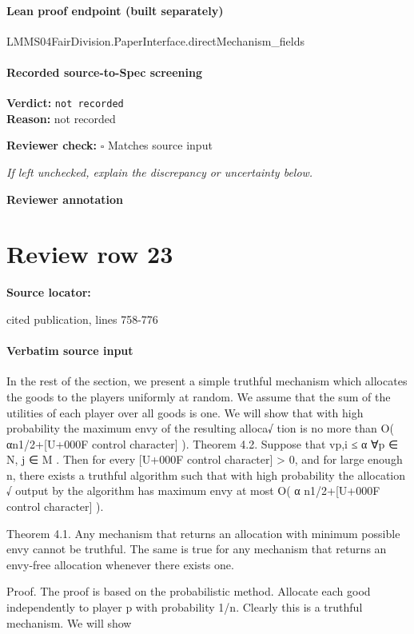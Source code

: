 \documentclass[10pt]{article}
\newcommand{\reviewerbox}{%
  \par\noindent\fbox{\parbox{0.96\linewidth}{\rule{0pt}{0.38in}}}\par
}
\newcommand{\reviewmatch}[1]{%
  \par\noindent\textbf{Reviewer check:} $\square$\; #1\par
  \noindent\emph{If left unchecked, explain the discrepancy or uncertainty below.}\par
}
\begin{document}
\paragraph{Lean proof endpoint (built separately)}\begin{ReviewVerbatim}
LMMS04FairDivision.PaperInterface.directMechanism_fields
\end{ReviewVerbatim}

\paragraph{Recorded source-to-Spec screening}
\textbf{Verdict:} \texttt{not recorded}
\\
\textbf{Reason:} not recorded
\reviewmatch{Matches source input}
\noindent\textbf{Reviewer annotation}\par
\reviewerbox
\clearpage
\hypertarget{source-claim-250a99e88b7ae2ef}{}
\section*{Review row 23}
\textbf{Source locator:} {\footnotesize\raggedright cited publication, lines 758-\allowbreak{}776\par}
\paragraph{Verbatim source input}
\begin{ReviewVerbatim}
In the rest of the section, we present a simple truthful
mechanism which allocates the goods to the players uniformly at random. We assume that the sum of the utilities
of each player over all goods is one. We will show that with
high probability the maximum
envy of the resulting alloca√
tion is no more than O( αn1/2+[U+000F control character] ).
Theorem 4.2. Suppose that vp,i ≤ α ∀p ∈ N, j ∈ M .
Then for every [U+000F control character] > 0, and for large enough n, there exists
a truthful algorithm such that with high probability the allocation
√ output by the algorithm has maximum envy at most
O( α n1/2+[U+000F control character] ).

Theorem 4.1. Any mechanism that returns an allocation
with minimum possible envy cannot be truthful. The same is
true for any mechanism that returns an envy-free allocation
whenever there exists one.

Proof. The proof is based on the probabilistic method.
Allocate each good independently to player p with probability 1/n. Clearly this is a truthful mechanism. We will show
\end{ReviewVerbatim}
\end{document}
